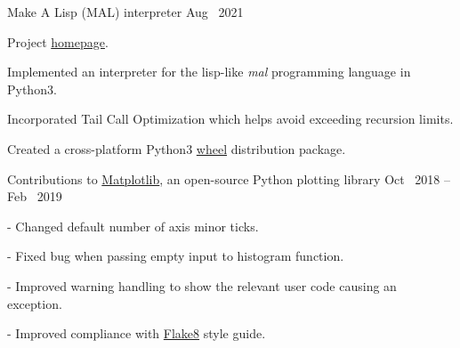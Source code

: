 

\begin{cventries}

  \cventryWithTags
  {Make A Lisp (MAL) interpreter} %
    {} %
    {} %
    {Aug \ 2021} %
    { }
    {
      \begin{cvitems} %
        \hypersetup{urlcolor=blue}
      \item Project \href{https://github.com/hershen/mal/tree/master/impls/myPython}{homepage}.
      \item Implemented an interpreter for the lisp-like \emph{mal} programming language in Python3.
      \item Incorporated Tail Call Optimization which helps avoid exceeding recursion limits.
      \item Created a cross-platform Python3 \href{https://pypi.org/project/mal-python}{wheel} distribution package.
      \end{cvitems}
    }

  
    \cventryWithTags
    {Contributions to \hypersetup{urlcolor=blue}\href{https://www.github.com/matplotlib/matplotlib}{Matplotlib}, an open-source Python plotting library} %
    {} %
    {} %
    {Oct \ 2018 -- Feb \ 2019} %
    { }
    {
      \begin{cvitems}
        \hypersetup{urlcolor=blue}
      \item {} - Changed default number of axis minor ticks.
      \item {} - Fixed bug when passing empty input to histogram function.
      \item {} - Improved warning handling to show the relevant user code
        causing an exception.
      \item {} - Improved compliance with \href{https://flake8.pycqa.org/en/latest}{Flake8} style guide.
      \end{cvitems}
    }

  \end{cventries}
